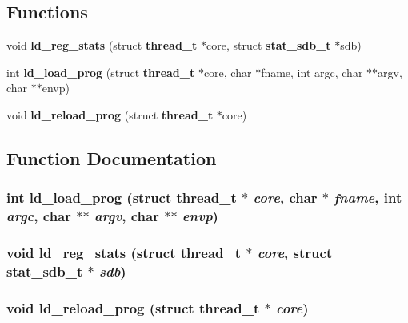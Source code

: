 \subsection*{Functions}
\begin{CompactItemize}
\item 
void {\bf ld\_\-reg\_\-stats} (struct {\bf thread\_\-t} $\ast$core, struct {\bf stat\_\-sdb\_\-t} $\ast$sdb)
\item 
int {\bf ld\_\-load\_\-prog} (struct {\bf thread\_\-t} $\ast$core, char $\ast$fname, int argc, char $\ast$$\ast$argv, char $\ast$$\ast$envp)
\item 
void {\bf ld\_\-reload\_\-prog} (struct {\bf thread\_\-t} $\ast$core)
\end{CompactItemize}


\subsection{Function Documentation}
\subsubsection[{ld\_\-load\_\-prog}]{\setlength{\rightskip}{0pt plus 5cm}int ld\_\-load\_\-prog (struct {\bf thread\_\-t} $\ast$ {\em core}, \/  char $\ast$ {\em fname}, \/  int {\em argc}, \/  char $\ast$$\ast$ {\em argv}, \/  char $\ast$$\ast$ {\em envp})}\label{loader_8h_46fd5683907973369c2950d54ffb2bc5}


\subsubsection[{ld\_\-reg\_\-stats}]{\setlength{\rightskip}{0pt plus 5cm}void ld\_\-reg\_\-stats (struct {\bf thread\_\-t} $\ast$ {\em core}, \/  struct {\bf stat\_\-sdb\_\-t} $\ast$ {\em sdb})}\label{loader_8h_2947cc416115e366e8a8bbd9c7893521}


\subsubsection[{ld\_\-reload\_\-prog}]{\setlength{\rightskip}{0pt plus 5cm}void ld\_\-reload\_\-prog (struct {\bf thread\_\-t} $\ast$ {\em core})}\label{loader_8h_0d5544dd04d7259ae232633d79b8a9eb}


